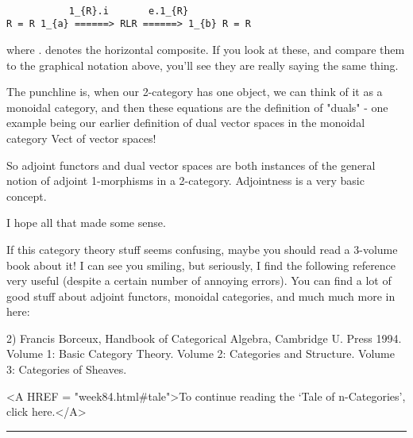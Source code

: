 \begin{verbatim}

           1_{R}.i       e.1_{R}
R = R 1_{a} ======> RLR ======> 1_{b} R = R

\end{verbatim}
    
where . denotes the horizontal composite.  If you look at these, and
compare them to the graphical notation above, you'll see they are really
saying the same thing.

The punchline is, when our 2-category has one object, we can think of it
as a monoidal category, and then these equations are the definition of
"duals" - one example being our earlier definition of dual vector
spaces in the monoidal category Vect of vector spaces!

So adjoint functors and dual vector spaces are both instances of 
the general notion of adjoint 1-morphisms in a 2-category.  Adjointness
is a very basic concept.

I hope all that made some sense.  

If this category theory stuff seems confusing, maybe you should read a
3-volume book about it!  I can see you smiling, but seriously, I find
the following reference very useful (despite a certain number of
annoying errors).  You can find a lot of good stuff about adjoint
functors, monoidal categories, and much much more in here:

2) Francis Borceux, Handbook of Categorical Algebra, Cambridge U. Press
1994.  Volume 1: Basic Category Theory.  Volume 2: Categories and
Structure.  Volume 3: Categories of Sheaves.  




<A HREF = "week84.html#tale">To continue reading the `Tale of
n-Categories', click here.</A>



\par\noindent\rule{\textwidth}{0.4pt}
